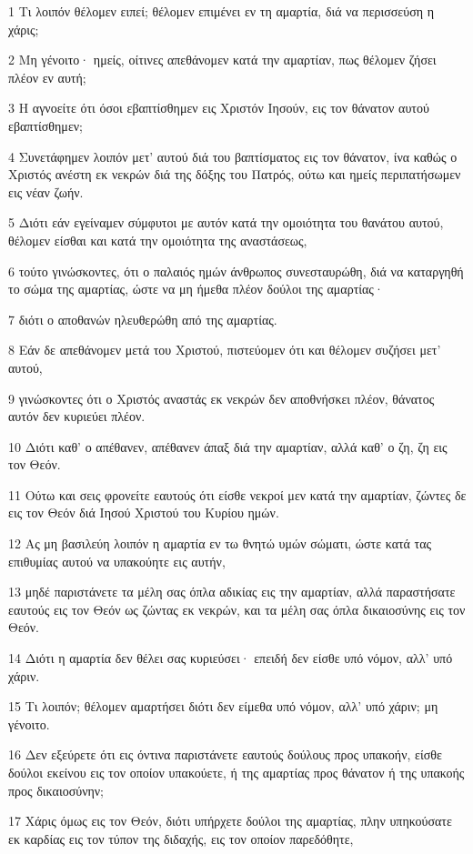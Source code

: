 \par 1 Τι λοιπόν θέλομεν ειπεί; θέλομεν επιμένει εν τη αμαρτία, διά να περισσεύση η χάρις;
\par 2 Μη γένοιτο· ημείς, οίτινες απεθάνομεν κατά την αμαρτίαν, πως θέλομεν ζήσει πλέον εν αυτή;
\par 3 Η αγνοείτε ότι όσοι εβαπτίσθημεν εις Χριστόν Ιησούν, εις τον θάνατον αυτού εβαπτίσθημεν;
\par 4 Συνετάφημεν λοιπόν μετ' αυτού διά του βαπτίσματος εις τον θάνατον, ίνα καθώς ο Χριστός ανέστη εκ νεκρών διά της δόξης του Πατρός, ούτω και ημείς περιπατήσωμεν εις νέαν ζωήν.
\par 5 Διότι εάν εγείναμεν σύμφυτοι με αυτόν κατά την ομοιότητα του θανάτου αυτού, θέλομεν είσθαι και κατά την ομοιότητα της αναστάσεως,
\par 6 τούτο γινώσκοντες, ότι ο παλαιός ημών άνθρωπος συνεσταυρώθη, διά να καταργηθή το σώμα της αμαρτίας, ώστε να μη ήμεθα πλέον δούλοι της αμαρτίας·
\par 7 διότι ο αποθανών ηλευθερώθη από της αμαρτίας.
\par 8 Εάν δε απεθάνομεν μετά του Χριστού, πιστεύομεν ότι και θέλομεν συζήσει μετ' αυτού,
\par 9 γινώσκοντες ότι ο Χριστός αναστάς εκ νεκρών δεν αποθνήσκει πλέον, θάνατος αυτόν δεν κυριεύει πλέον.
\par 10 Διότι καθ' ο απέθανεν, απέθανεν άπαξ διά την αμαρτίαν, αλλά καθ' ο ζη, ζη εις τον Θεόν.
\par 11 Ούτω και σεις φρονείτε εαυτούς ότι είσθε νεκροί μεν κατά την αμαρτίαν, ζώντες δε εις τον Θεόν διά Ιησού Χριστού του Κυρίου ημών.
\par 12 Ας μη βασιλεύη λοιπόν η αμαρτία εν τω θνητώ υμών σώματι, ώστε κατά τας επιθυμίας αυτού να υπακούητε εις αυτήν,
\par 13 μηδέ παριστάνετε τα μέλη σας όπλα αδικίας εις την αμαρτίαν, αλλά παραστήσατε εαυτούς εις τον Θεόν ως ζώντας εκ νεκρών, και τα μέλη σας όπλα δικαιοσύνης εις τον Θεόν.
\par 14 Διότι η αμαρτία δεν θέλει σας κυριεύσει· επειδή δεν είσθε υπό νόμον, αλλ' υπό χάριν.
\par 15 Τι λοιπόν; θέλομεν αμαρτήσει διότι δεν είμεθα υπό νόμον, αλλ' υπό χάριν; μη γένοιτο.
\par 16 Δεν εξεύρετε ότι εις όντινα παριστάνετε εαυτούς δούλους προς υπακοήν, είσθε δούλοι εκείνου εις τον οποίον υπακούετε, ή της αμαρτίας προς θάνατον ή της υπακοής προς δικαιοσύνην;
\par 17 Χάρις όμως εις τον Θεόν, διότι υπήρχετε δούλοι της αμαρτίας, πλην υπηκούσατε εκ καρδίας εις τον τύπον της διδαχής, εις τον οποίον παρεδόθητε,

